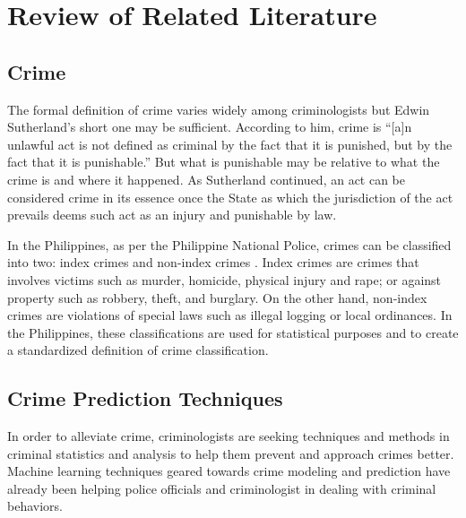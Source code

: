 
\chapter{Review of Related Literature}  %

\section{Crime} %
    The formal definition of crime varies widely among criminologists but Edwin Sutherland’s short one may be sufficient. According to him, crime is “[a]n unlawful act is not defined as criminal by the fact that it is punished, but by the fact that it is punishable.” \citep{brown2010criminology} But what is punishable may be relative to what the crime is and where it happened. As Sutherland continued, an act can be considered crime in its essence once the State as which the jurisdiction of the act prevails deems such act as an injury and punishable by law.

    In the Philippines, as per the Philippine National Police, crimes can be classified into two: index crimes and non-index crimes \citep{senate2013criminal}. Index crimes are crimes that involves victims such as murder, homicide, physical injury and rape; or against property such as robbery, theft, and burglary. On the other hand, non-index crimes are violations of special laws such as illegal logging or local ordinances. In the Philippines, these classifications are used for statistical purposes and to create a standardized definition of crime classification\citep{tumulak2015crime}.

\section{Crime Prediction Techniques} %
    In order to alleviate crime, criminologists are seeking techniques and methods in criminal statistics and analysis to help them prevent and approach crimes better. Machine learning techniques geared towards crime modeling and prediction have already been helping police officials and criminologist in dealing with criminal behaviors.

